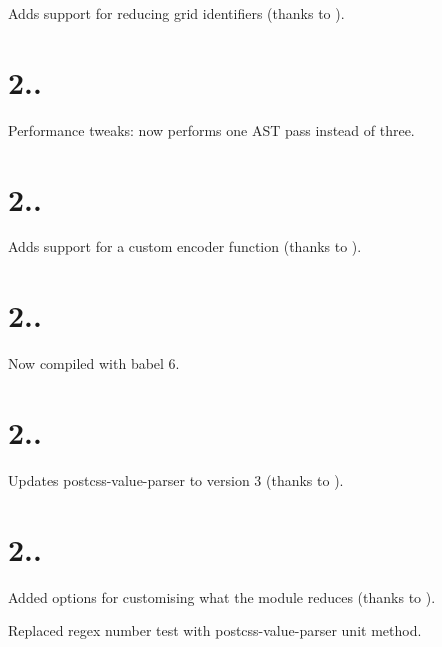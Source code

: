 
\begin{DoxyItemize}
\item Adds support for reducing {\ttfamily grid} identifiers (thanks to ).
\end{DoxyItemize}

\section*{2..}


\begin{DoxyItemize}
\item Performance tweaks\+: now performs one A\+ST pass instead of three.
\end{DoxyItemize}

\section*{2..}


\begin{DoxyItemize}
\item Adds support for a custom encoder function (thanks to ).
\end{DoxyItemize}

\section*{2..}


\begin{DoxyItemize}
\item Now compiled with babel 6.
\end{DoxyItemize}

\section*{2..}


\begin{DoxyItemize}
\item Updates postcss-\/value-\/parser to version 3 (thanks to ).
\end{DoxyItemize}

\section*{2..}


\begin{DoxyItemize}
\item Added options for customising what the module reduces (thanks to ).
\item Replaced regex number test with postcss-\/value-\/parser unit method.
\end{DoxyItemize}

